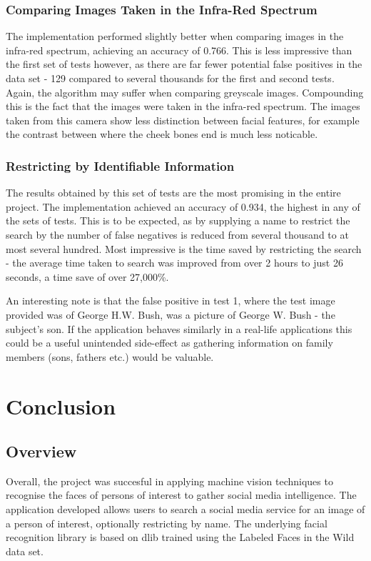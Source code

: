 \documentclass[12pt]{article}
\begin{document}
\subsubsection{Comparing Images Taken in the Infra-Red Spectrum}
The implementation performed slightly better when comparing images in the infra-red spectrum, achieving an accuracy of 0.766. This is less impressive than the first set of tests however, as there are far fewer potential false positives in the data set - 129 compared to several thousands for the first and second tests. Again, the algorithm may suffer when comparing greyscale images. Compounding this is the fact that the images were taken in the infra-red spectrum. The images taken from this camera show less distinction between facial features, for example the contrast between where the cheek bones end is much less noticable.

\subsubsection{Restricting by Identifiable Information}
The results obtained by this set of tests are the most promising in the entire project. The implementation achieved an accuracy of 0.934, the highest in any of the sets of tests. This is to be expected, as by supplying a name to restrict the search by the number of false negatives is reduced from several thousand to at most several hundred. Most impressive is the time saved by restricting the search - the average time taken to search was improved from over 2 hours to just 26 seconds, a time save of over 27,000\%.

An interesting note is that the false positive in test 1, where the test image provided was of George H.W. Bush, was a picture of George W. Bush - the subject's son. If the application behaves similarly in a real-life applications this could be a useful unintended side-effect as gathering information on family members (sons, fathers etc.) would be valuable.

\newpage
\section{Conclusion}
\subsection{Overview}
Overall, the project was succesful in applying machine vision techniques to recognise the faces of persons of interest to gather social media intelligence. The application developed allows users to search a social media service for an image of a person of interest, optionally restricting by name. The underlying facial recognition library is based on dlib trained using the Labeled Faces in the Wild data set.
\end{document}
